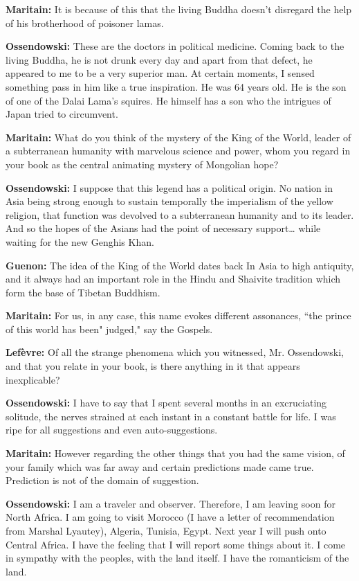 \textbf{Maritain:} It is because of this that the living Buddha doesn't disregard the help of his brotherhood of poisoner lamas.

\textbf{Ossendowski:} These are the doctors in political medicine. Coming back to the living Buddha, he is not drunk every day and apart from that defect, he appeared to me to be a very superior man. At certain moments, I sensed something pass in him like a true inspiration. He was 64 years old. He is the son of one of the Dalai Lama's squires. He himself has a son who the intrigues of Japan tried to circumvent.

\textbf{Maritain:} What do you think of the mystery of the King of the World, leader of a subterranean humanity with marvelous science and power, whom you regard in your book as the central animating mystery of Mongolian hope?

\textbf{Ossendowski:} I suppose that this legend has a political origin. No nation in Asia being strong enough to sustain temporally the imperialism of the yellow religion, that function was devolved to a subterranean humanity and to its leader. And so the hopes of the Asians had the point of necessary support… while waiting for the new Genghis Khan.

\textbf{Guenon:} The idea of the King of the World dates back In Asia to high antiquity, and it always had an important role in the Hindu and Shaivite tradition which form the base of Tibetan Buddhism.

\textbf{Maritain:} For us, in any case, this name evokes different assonances, ``the prince of this world has been" judged," say the Gospels.

\textbf{Lefèvre:} Of all the strange phenomena which you witnessed, Mr. Ossendowski, and that you relate in your book, is there anything in it that appears inexplicable?

\textbf{Ossendowski:} I have to say that I spent several months in an excruciating solitude, the nerves strained at each instant in a constant battle for life. I was ripe for all suggestions and even auto-suggestions.

\textbf{Maritain:} However regarding the other things that you had the same vision, of your family which was far away and certain predictions made came true. Prediction is not of the domain of suggestion.

\textbf{Ossendowski:} I am a traveler and observer. Therefore, I am leaving soon for North Africa. I am going to visit Morocco (I have a letter of recommendation from Marshal Lyautey), Algeria, Tunisia, Egypt. Next year I will push onto Central Africa. I have the feeling that I will report some things about it. I come in sympathy with the peoples, with the land itself. I have the romanticism of the land.


